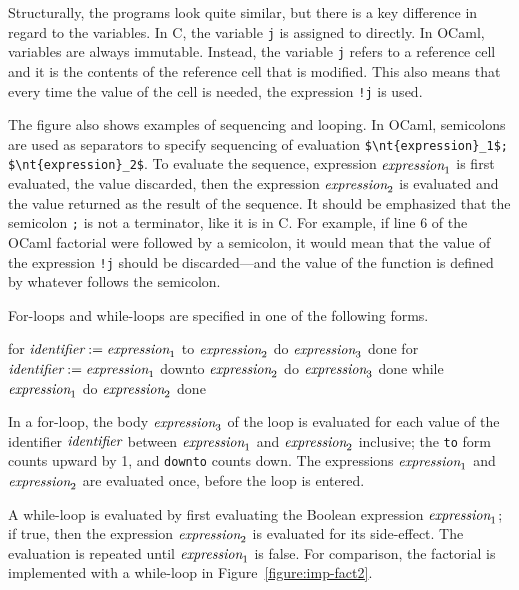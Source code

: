 Structurally, the programs look quite similar, but there is a key difference in regard to the
variables.  In C, the variable \hbox{\lstinline/j/} is assigned to directly.  In OCaml, variables are
always immutable.  Instead, the variable \hbox{\lstinline/j/} refers to a reference cell and it is the
contents of the reference cell that is modified.  This also means that every time the value of the
cell is needed, the expression \hbox{\lstinline/!j/} is used.

\label{keyword:;(sequencing)}
The figure also shows examples of sequencing and looping.  In OCaml, semicolons are used as
separators to specify sequencing of evaluation \hbox{\lstinline/$\nt{expression}_1$; $\nt{expression}_2$/}.
To evaluate the sequence, expression $\textit{\rmfamily expression}_1$ is first evaluated, the value discarded,
then the expression $\textit{\rmfamily expression}_2$ is evaluated and the value returned as the result of the
sequence.  It should be emphasized that the semicolon \hbox{\lstinline/;/} is not a terminator, like
it is in C.  For example, if line 6 of the OCaml factorial were followed by a semicolon, it would
mean that the value of the expression \hbox{\lstinline/!j/} should be discarded---and the value of the
function is defined by whatever follows the semicolon.

\label{keyword:while}
\label{keyword:for}
\label{keyword:do}
\label{keyword:done}
\label{keyword:to}
\label{keyword:downto}
For-loops and while-loops are specified in one of the following forms.

\begin{ocaml}
for $\textit{\rmfamily identifier} := \textit{\rmfamily expression}_1$ to $\textit{\rmfamily expression}_2$ do $\textit{\rmfamily expression}_3$ done
for $\textit{\rmfamily identifier} := \textit{\rmfamily expression}_1$ downto $\textit{\rmfamily expression}_2$ do $\textit{\rmfamily expression}_3$ done
while $\textit{\rmfamily expression}_1$ do $\textit{\rmfamily expression}_2$ done
\end{ocaml}
%
In a for-loop, the body $\textit{\rmfamily expression}_3$ of the loop is evaluated for each value of the identifier
$\textit{\rmfamily identifier}$ between $\textit{\rmfamily expression}_1$ and $\textit{\rmfamily expression}_2$ inclusive; the \hbox{\lstinline/to/}
form counts upward by 1, and \hbox{\lstinline/downto/} counts down.  The expressions $\textit{\rmfamily expression}_1$
and $\textit{\rmfamily expression}_2$ are evaluated once, before the loop is entered.

A while-loop is evaluated by first evaluating the Boolean
expression $\textit{\rmfamily expression}_1$; if true, then the expression $\textit{\rmfamily expression}_2$ is evaluated for
its side-effect.  The evaluation is repeated until $\textit{\rmfamily expression}_1$ is false.  For comparison,
the factorial is implemented with a while-loop in Figure~\ref{figure:imp-fact2}.


